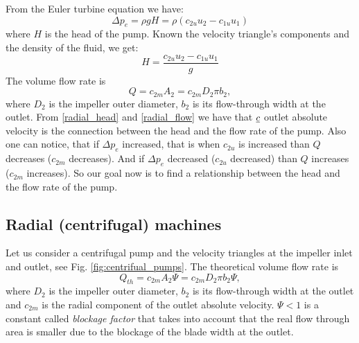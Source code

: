 From the Euler turbine equation we have:
%
\begin{equation*}
  \Delta p_e = \rho g H = \rho \left( c_{2u}u_2 - c_{1u}u_1 \right)
\end{equation*}
%
where $H$ is the head of the pump. Known the velocity triangle's components and the density of the fluid, we get:
%
\begin{equation}\label{radial_head}
  H = \frac{c_{2u}u_2 - c_{1u}u_1}{g}
\end{equation}
%
The volume flow rate is
\begin{equation}\label{radial_flow}
  Q = c_{2m} A_2 =c_{2m} D_2 \pi b_2,
\end{equation}
%
where $D_2$ is the impeller outer diameter, $b_2$ is its flow-through width at the outlet. From \ref{radial_head} and \ref{radial_flow} we have that $\underline{c}$ outlet absolute velocity is the connection between the head and the flow rate of the pump. Also one can notice, that if $ \Delta p_e$ increased, that is when $c_{2u}$ is increased than $Q$ decreases ($c_{2m}$ decreases). And if $\Delta p_e$ decreased ($c_{2u}$ decreased) than $Q$ increases ($c_{2m}$ increases). So our goal now is to find a relationship between the head and the flow rate of the pump.

\subsection{Radial (centrifugal) machines}

Let us consider a centrifugal pump and the velocity triangles at the impeller inlet and outlet, see Fig. \ref{fig:centrifual_pumps}. The theoretical volume flow rate is
%
\begin{equation}
Q_{th}=c_{2m} A_2 \Psi =c_{2m} D_2 \pi b_2 \Psi,
\end{equation}
%
where $D_2$ is the impeller outer diameter, $b_2$ is its flow-through width at the outlet and $c_{2m}$ is the radial component of the outlet absolute velocity. $\Psi<1$ is a constant called \emph{blockage factor} that takes into account that the real flow through area is smaller due to the blockage of the blade width at the outlet.

